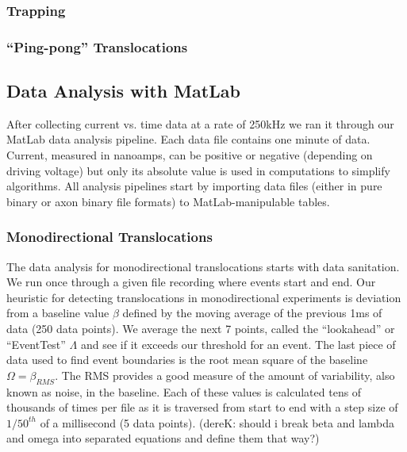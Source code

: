 \documentclass[aps,prl,preprint,groupedaddress]{revtex4}
\begin{document}
\subsubsection{Trapping}



\subsubsection{``Ping-pong'' Translocations}



\subsection{Data Analysis with MatLab}

After collecting current vs. time data at a rate of 250kHz we ran it through our MatLab data analysis pipeline.
Each data file contains one minute of data.
Current, measured in nanoamps, can be positive or negative (depending on driving voltage) but only its absolute value is used in computations to simplify algorithms.
All analysis pipelines start by importing data files (either in pure binary or axon binary file formats) to MatLab-manipulable tables.

\subsubsection{Monodirectional Translocations}

The data analysis for monodirectional translocations starts with data sanitation.
We run once through a given file recording where events start and end.
Our heuristic for detecting translocations in monodirectional experiments is deviation from a baseline value \(\beta\) defined by the moving average of the previous 1ms of data (250 data points).
We average the next 7 points, called the ``lookahead'' or ``EventTest'' \(\Lambda\) and see if it exceeds our threshold for an event.
The last piece of data used to find event boundaries is the root mean square of the baseline \(\Omega = \beta_{RMS}\).
The RMS provides a good measure of the amount of variability, also known as noise, in the baseline.
Each of these values is calculated tens of thousands of times per file as it is traversed from start to end with a step size of \(1/50^{th}\) of a millisecond (5 data points). (dereK: should i break beta and lambda and omega into separated equations and define them that way?)
\end{document}
